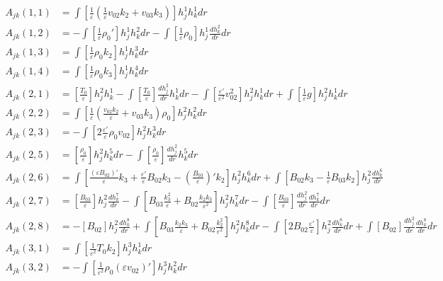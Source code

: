 \documentclass[11pt, fleqn]{article}
\newcommand{\eps}{\varepsilon}
\begin{document}
\begin{align*}
	A_{jk}(1, 1) &=  \int \left[\frac{1}{\eps}\left(\frac{1}{\eps}v_{02}k_2 + v_{03}k_3\right)\right] h_j^1 h_k^1 dr									\\
	A_{jk}(1, 2) &= -\int \left[\frac{1}{\eps}\rho_0'\right] h_j^1 h_k^2 dr - \int  \left[\frac{1}{\eps}\rho_0\right] h_j^1 \frac{dh_k^2}{dr} dr		\\
	A_{jk}(1, 3) &=  \int \left[\frac{1}{\eps}\rho_0 k_2\right] h_j^1 h_k^3 dr																			\\
	A_{jk}(1, 4) &=  \int \left[\frac{1}{\eps}\rho_0 k_3\right] h_j^1 h_k^4 dr																			\\
	A_{jk}(2, 1) &=  \left[\frac{T_0}{\eps}\right] h_j^2 h_k^1 - \int \left[\frac{T_0}{\eps}\right] \frac{dh_j^2}{dr} h_k^1 dr - \int \left[\frac{\eps'}{\eps^2}v_{02}^2\right]h_j^2h_k^1 dr + \int \left[\frac{1}{\eps}g\right]h_j^2h_k^1 dr			\\
	A_{jk}(2, 2) &=  \int \left[\frac{1}{\eps}\left(\frac{v_{02}k_2}{\eps} + v_{03}k_3\right)\rho_0\right]h_j^2h_k^2 dr									\\
	A_{jk}(2, 3) &= -\int \left[2\frac{\eps'}{\eps}\rho_0v_{02}\right]h_j^2 h_k^3 dr																	\\
	A_{jk}(2, 5) &=  \left[\frac{\rho_0}{\eps}\right]h_j^2 h_k^5 dr - \int \left[\frac{\rho_0}{\eps}\right]\frac{dh_j^2}{dr}h_k^5 dr					\\
	A_{jk}(2, 6) &=  \int \left[\frac{(\eps B_{02})'}{\eps}k_3 + \frac{\eps'}{\eps}B_{02}k_3 -\left(\frac{B_{03}}{\eps}\right)'k_2\right] h_j^2 h_k^6 dr  + \int \left[B_{02}k_3 - \frac{1}{\eps}B_{03}k_2\right] h_j^2 \frac{dh_k^6}{dr} 				\\
	A_{jk}(2, 7) &=  \left[\frac{B_{03}}{\eps}\right] h_j^2 \frac{dh_k^7}{dr} - \int \left[B_{03}\frac{k_3^2}{\eps} + B_{02}\frac{k_2k_3}{\eps^2}\right] h_j^2 h_k^7 dr - \int \left[\frac{B_{03}}{\eps}\right]\frac{dh_j^2}{dr}\frac{dh_k^7}{dr}dr		\\
	A_{jk}(2, 8) &=  -\left[B_{02}\right]h_j^2\frac{dh_k^8}{dr} + \int \left[B_{03}\frac{k_2k_3}{\eps} + B_{02}\frac{k_2^2}{\eps^2}\right] h_j^2 h_k^8 dr - \int \left[2B_{02}\frac{\eps'}{\eps}\right]h_j^2 \frac{dh_k^8}{dr} dr	
					+\int \left[B_{02}\right]\frac{dh_j^2}{dr}\frac{dh_k^8}{dr}dr																		\\
	A_{jk}(3, 1) &=  \int \left[\frac{1}{\eps^2}T_0k_2\right]h_j^3 h_k^1 dr																				\\
	A_{jk}(3, 2) &= -\int \left[\frac{1}{\eps^2}\rho_0(\eps v_{02})'\right]h_j^3 h_k^2 dr																\\

\end{align*}
\end{document}
